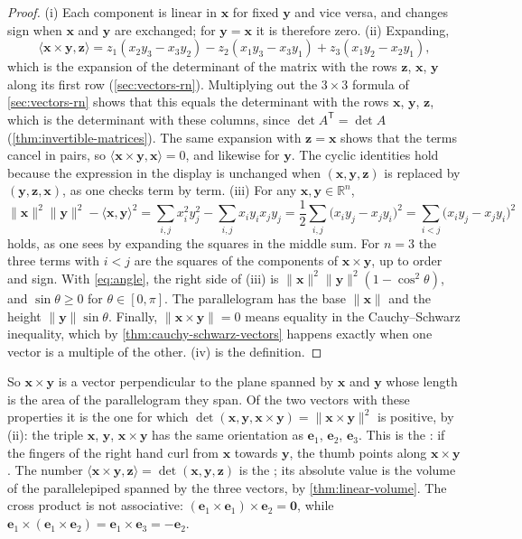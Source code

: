 \begin{proof}
(i) Each component is linear in $\mathbf x$ for fixed $\mathbf y$ and vice versa, and changes sign when $\mathbf x$ and $\mathbf y$ are exchanged; for $\mathbf y=\mathbf x$ it is therefore zero. (ii) Expanding,
\[
\langle\mathbf x\times\mathbf y,\mathbf z\rangle=z_1(x_2y_3-x_3y_2)-z_2(x_1y_3-x_3y_1)+z_3(x_1y_2-x_2y_1),
\]
which is the expansion of the determinant of the matrix with the rows $\mathbf z$, $\mathbf x$, $\mathbf y$ along its first row (\cref{sec:vectors-rn}). Multiplying out the $3\times3$ formula of \cref{sec:vectors-rn} shows that this equals the determinant with the rows $\mathbf x$, $\mathbf y$, $\mathbf z$, which is the determinant with these columns, since $\det A^{\mathsf T}=\det A$ (\cref{thm:invertible-matrices}). The same expansion with $\mathbf z=\mathbf x$ shows that the terms cancel in pairs, so $\langle\mathbf x\times\mathbf y,\mathbf x\rangle=0$, and likewise for $\mathbf y$. The cyclic identities hold because the expression in the display is unchanged when $(\mathbf x,\mathbf y,\mathbf z)$ is replaced by $(\mathbf y,\mathbf z,\mathbf x)$, as one checks term by term. (iii) For any $\mathbf x,\mathbf y\in\mathbb R^n$, 
\[
\|\mathbf x\|^2\|\mathbf y\|^2-\langle\mathbf x,\mathbf y\rangle^2=\sum_{i,j}x_i^2y_j^2-\sum_{i,j}x_iy_ix_jy_j=\frac12\sum_{i,j}\bigl(x_iy_j-x_jy_i\bigr)^2=\sum_{i<j}\bigl(x_iy_j-x_jy_i\bigr)^2
\]
holds, as one sees by expanding the squares in the middle sum. For $n=3$ the three terms with $i<j$ are the squares of the components of $\mathbf x\times\mathbf y$, up to order and sign. With \eqref{eq:angle}, the right side of (iii) is $\|\mathbf x\|^2\|\mathbf y\|^2(1-\cos^2\theta)$, and $\sin\theta\ge0$ for $\theta\in[0,\pi]$. The parallelogram has the base $\|\mathbf x\|$ and the height $\|\mathbf y\|\sin\theta$. Finally, $\|\mathbf x\times\mathbf y\|=0$ means equality in the Cauchy--Schwarz inequality, which by \cref{thm:cauchy-schwarz-vectors} happens exactly when one vector is a multiple of the other. (iv) is the definition.
\end{proof}

So $\mathbf x\times\mathbf y$ is a vector perpendicular to the plane spanned by $\mathbf x$ and $\mathbf y$ whose length is the area of the parallelogram they span. Of the two vectors with these properties it is the one for which $\det(\mathbf x,\mathbf y,\mathbf x\times\mathbf y)=\|\mathbf x\times\mathbf y\|^2$ is positive, by (ii): the triple $\mathbf x$, $\mathbf y$, $\mathbf x\times\mathbf y$ has the same orientation as $\mathbf e_1$, $\mathbf e_2$, $\mathbf e_3$. This is the : if the fingers of the right hand curl from $\mathbf x$ towards $\mathbf y$, the thumb points along $\mathbf x\times\mathbf y$. The number $\langle\mathbf x\times\mathbf y,\mathbf z\rangle=\det(\mathbf x,\mathbf y,\mathbf z)$ is the ; its absolute value is the volume of the parallelepiped spanned by the three vectors, by \cref{thm:linear-volume}. The cross product is not associative: $(\mathbf e_1\times\mathbf e_1)\times\mathbf e_2=\mathbf0$, while $\mathbf e_1\times(\mathbf e_1\times\mathbf e_2)=\mathbf e_1\times\mathbf e_3=-\mathbf e_2$.

